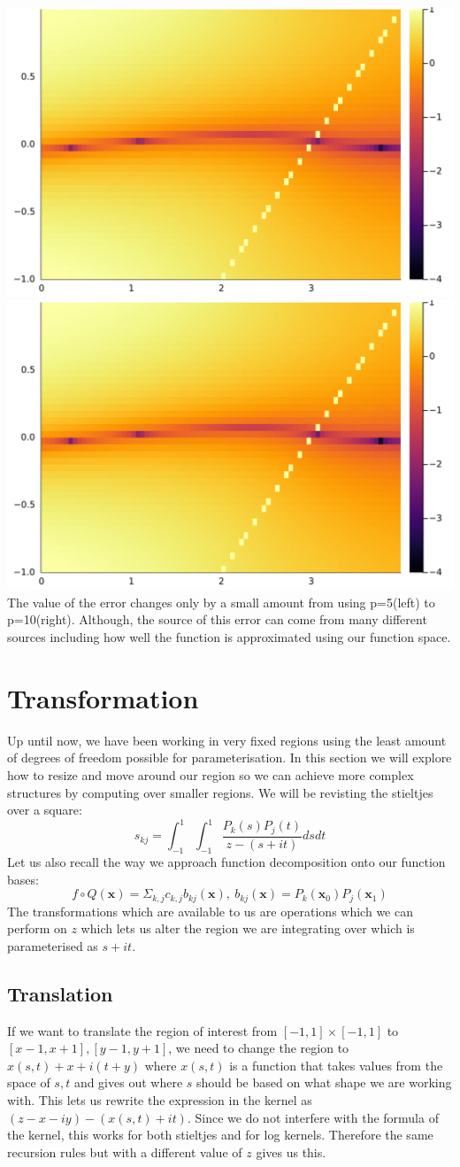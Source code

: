 \documentclass{article}
\begin{document}
\includegraphics[width=.5\textwidth]{potentialp5}
\includegraphics[width=.5\textwidth]{potentialp10}
The value of the error changes only by a small amount from using p=5(left) to p=10(right).
Although, the source of this error can come from many different sources including how well the function is approximated using our function space.
\section{Transformation}
Up until now, we have been working in very fixed regions using the least amount of degrees of freedom possible for parameterisation.
In this section we will explore how to resize and move around our region so we can achieve more complex structures by computing over smaller regions.
We will be revisting the stieltjes over a square:
$$s_{kj} = \int_{-1}^1\int_{-1}^1\frac{P_k(s)P_j(t)}{z-(s+it)}dsdt$$
Let us also recall the way we approach function decomposition onto our function bases:
$$f\circ Q(\textbf{x})=\Sigma_{k,j}c_{k,j}b_{kj}(\textbf{x}),\:b_{kj}(\textbf{x})=P_k(\textbf{x}_0)P_j(\textbf{x}_1)$$
The transformations which are available to us are operations which we can perform on $z$ which lets us alter the region we are integrating over which is parameterised as $s+it$.

\subsection{Translation}
If we want to translate the region of interest from $[-1,1]\times[-1,1]$ to $[x-1,x+1],[y-1,y+1]$, we need to change the region to $x(s,t)+x+i(t+y)$ where $x(s,t)$ is a function that takes values from the space of $s,t$ and gives out where $s$ should be based on what shape we are working with.
This lets us rewrite the expression in the kernel as $(z-x-iy)-(x(s,t)+it)$.
Since we do not interfere with the formula of the kernel, this works for both stieltjes and for log kernels.
Therefore the same recursion rules but with a different value of $z$ gives us this.
\end{document}
